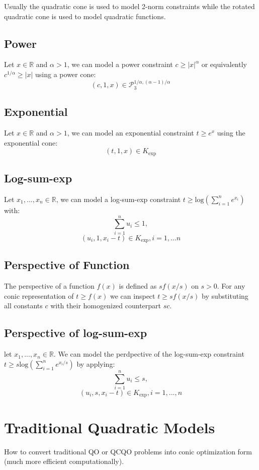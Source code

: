 \documentclass{article}
\begin{document}
Usually the quadratic cone is used to model 2-norm constraints while the
rotated quadratic cone is used to model quadratic functions.

\subsection{Power}
Let $x\in \mathbb{R}$ and $\alpha>1$, we can model a power constraint
$c \geq |x|^\alpha$ or equivalently $c^{1/\alpha}\geq|x|$ using a power
cone:
$$(c,1,x) \in \mathcal{P}_3^{1/\alpha,(\alpha-1)/\alpha}$$

\subsection{Exponential}
Let $x\in\mathbb{R}$ and $\alpha>1$, we can model an exponential
constraint $t\geq e^x$ using the exponential cone:
$$(t,1,x)\in K_\text{exp}$$

\subsection{Log-sum-exp}
Let $x_1,...,x_n \in \mathbb{R}$, we can model a log-sum-exp
constraint $t\geq \text{log}(\sum^n_{i=1}e^{x_i})$ with:
$$\sum^n_{i=1}u_i \leq 1,$$
$$(u_i,1,x_i-t) \in K_\text{exp}, i=1,...n$$

\subsection{Perspective of Function}
The perspective of a function $f(x)$ is defined as $sf(x/s)$ on $s>0$. For any
conic representation of $t\geq f(x)$ we can inspect $t\geq sf(x/s)$ by substituting
all constants $c$ with their homogenized counterpart $sc$.

\subsection{Perspective of log-sum-exp}
let $x_1,...,x_n\in\mathbb{R}$. We can model the perdpective of the log-sum-exp
constraint $t \geq s\text{log}(\sum^n_{i=1}e^{x_i/s})$ by applying:
$$\sum^n_{i=1}u_i \leq s,$$
$$(u_i,s,x_i-t) \in K_\text{exp}, i=1,...,n$$

\section{Traditional Quadratic Models}
How to convert traditional QO or QCQO problems into conic optimization form (much
more efficient computationally).
\end{document}
